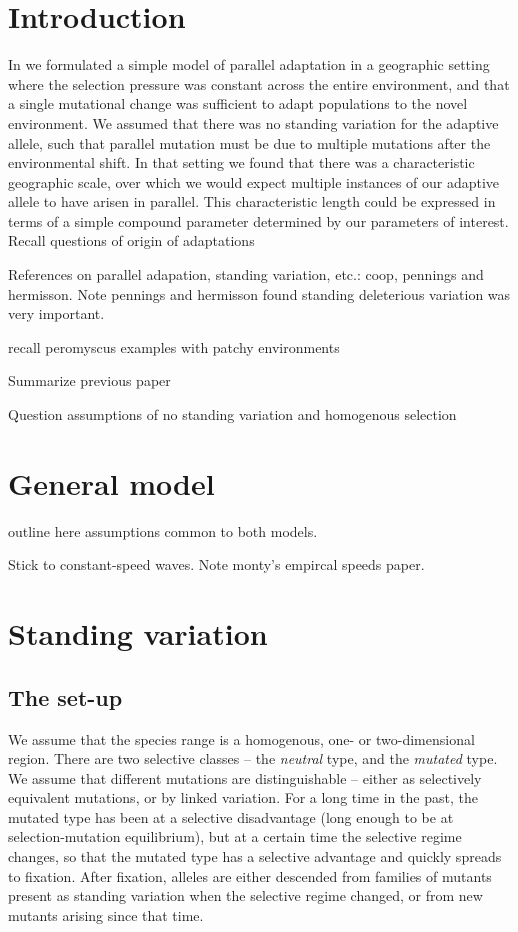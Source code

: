 \documentclass{article}
\begin{document}
\section{Introduction}



In \citep{RalphCoop} we formulated a simple model of parallel adaptation in a geographic setting
where the selection pressure was constant across the entire environment, 
and that a single mutational change was sufficient to adapt populations to the novel environment. 
We assumed that there was no standing variation for the adaptive allele, such that parallel mutation must be due to multiple mutations after the environmental shift. In that setting we found that there was a characteristic geographic scale, over which we would expect multiple instances of our adaptive allele to have arisen in parallel. This characteristic length could be expressed in terms of a simple compound parameter determined by our parameters of interest.
Recall questions of origin of adaptations

References on parallel adapation, standing variation, etc.:
  coop,
  pennings and hermisson.
Note pennings and hermisson found standing deleterious variation was very important.  

recall peromyscus examples with patchy environments

Summarize previous paper

Question assumptions of no standing variation and homogenous selection

\section{General model}

outline here assumptions common to both models.

Stick to constant-speed waves.
Note monty's empircal speeds paper.


\section{Standing variation}

\subsection{The set-up}


We assume that the species range
is a homogenous, one- or two-dimensional region. 
There are two selective classes -- the {\em neutral} type, and the {\em mutated} type.
We assume that different mutations are distinguishable --
either as selectively equivalent mutations, or by linked variation.
For a long time in the past, the mutated type has been at a selective disadvantage (long enough to be at selection-mutation equilibrium),
but at a certain time the selective regime changes, so that the mutated type has a selective advantage and quickly spreads to fixation.
After fixation, alleles are either descended
from families of mutants present as standing variation when the selective regime changed,
or from new mutants arising since that time.
\end{document}
